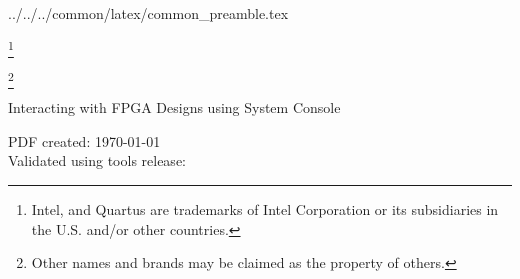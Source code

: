 %
%
%
%
%

\newcommand{\repoTopPath}{../../..}
\newcommand{\commonPreamblePath}{\repoTopPath/common/latex/common_preamble.tex}
 \commonPreamblePath


\sffamily

\begin{center}
\let\savethefootnote\thefootnote
\let\thefootnote\relax\footnote{Intel, and Quartus are trademarks of Intel Corporation or its subsidiaries in the U.S. and/or other countries.}
\addtocounter{footnote}{-1}
\let\thefootnote\savethefootnote
\hspace{-1em}
\let\savethefootnote\thefootnote
\let\thefootnote\relax\footnote{Other names and brands may be claimed as the property of others.}
\addtocounter{footnote}{-1}
\let\thefootnote\savethefootnote
\hspace{-1em}
\LARGE{Interacting with FPGA Designs using System Console}\\[1em]
\end{center}

\begin{flushleft}
\normalsize{PDF created: \today}\\
\normalsize{Validated using tools release: \TheToolsReleaseVersion}
\end{flushleft}

